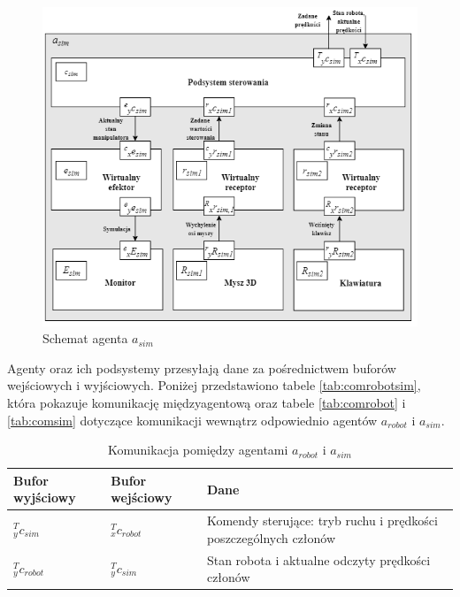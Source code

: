 \documentclass[a4paper, 12pt, twoside]{article}
\begin{document}
\begin{figure}[hbt!]
\centering
\includegraphics[width=1.0\linewidth]{images/agent_sim.png}
\caption{Schemat agenta $a_{sim}$ }
\label{fig:agent_sim}
\end{figure}

Agenty oraz ich podsystemy przesyłają dane za pośrednictwem buforów wejściowych i wyjściowych. Poniżej przedstawiono tabele \ref{tab:comrobotsim}, która pokazuje komunikację międzyagentową oraz tabele \ref{tab:comrobot} i \ref{tab:comsim} dotyczące komunikacji wewnątrz odpowiednio agentów $a_{robot}$ i $a_{sim}$. 

\begin{table}[htb!] \label{comrobotsim}
\begin{center}
\caption{Komunikacja pomiędzy agentami $a_{robot}$ i $a_{sim}$}
\begin{tabular}{ | l | l | p{6cm} |}
\hline
 Bufor wyjściowy & Bufor wejściowy & Dane \\ 
\hline
 $^T_yc_{sim}$ & $^T_xc_{robot}$ & Komendy sterujące: tryb ruchu i prędkości poszczególnych członów \\ 
\hline
 $^T_yc_{robot}$ & $^T_yc_{sim}$ & Stan robota i aktualne odczyty prędkości członów \\
\hline
\end{tabular}
\end{center}
\end{table}
\end{document}
